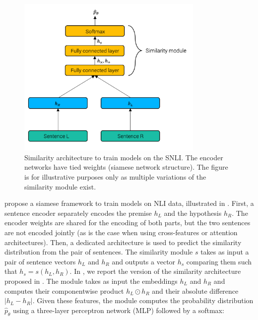 \begin{figure}[!ht]
	\includegraphics[width=9cm]{images/similarity-module.png}
	\caption{Similarity architecture to train models on the SNLI. The encoder networks have tied weights (siamese network structure). The figure is for illustrative purposes only as multiple variations of the similarity module exist.}
\end{figure}

\textcite{conneau_17} propose a siamese framework to train models on NLI data, illustrated in . First, a sentence encoder separately encodes the premise $h_L$ and the hypothesis $h_R$. The encoder weights are shared for the encoding of both parts, but the two sentences are not encoded jointly (as is the case when using cross-features or attention architectures). Then, a dedicated architecture is used to predict the similarity distribution from the pair of sentences. The similarity module $s$ takes as input a pair of sentence vectors $h_{L} $ and $h_{R}$  and outputs a vector $h_s$ comparing them such that $h_s = s(h_{L}, h_{R})$. In , we report the version of the similarity architecture proposed in \textcite{conneau_17}. The module takes as input the embeddings $h_{L} $ and $h_{R}$ and computes their component\-wise product $h_{L} \odot h_{R}$ and their absolute difference $|h_{L} - h_{R}|$. Given these features, the module computes the probability distribution  $\hat{p}_{\theta}$ using a three-layer perceptron network (MLP) followed by a softmax:

